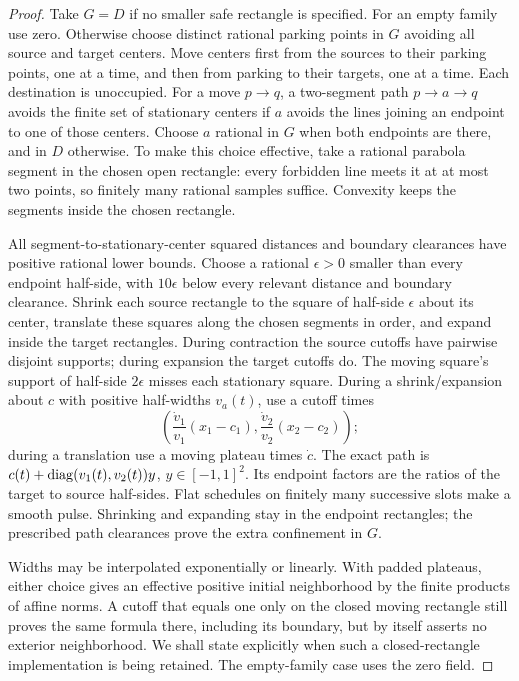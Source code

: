 \begin{proof}
Take $G=D$ if no smaller safe rectangle is specified.
For an empty family use zero.  Otherwise choose distinct rational
parking points in $G$ avoiding all source and
target centers.  Move centers first from the sources to their parking
points, one at a time, and then from parking to their targets, one at a
time.  Each destination is unoccupied.  For a move $p\to q$, a two-segment
path $p\to a\to q$ avoids the finite set of stationary centers if $a$
avoids the lines joining an endpoint to one of those centers.  Choose
$a$ rational in $G$ when both endpoints are there, and in $D$ otherwise.
To make this choice effective, take a rational parabola segment in the
chosen open rectangle: every forbidden line meets it at at most two
points, so finitely many rational samples suffice.  Convexity keeps the
segments inside the chosen rectangle.

All segment-to-stationary-center squared distances and boundary
clearances have positive rational lower bounds.  Choose a rational
$\epsilon>0$ smaller than every endpoint half-side, with $10\epsilon$
below every relevant distance and boundary clearance.  Shrink each
source rectangle to the square of half-side $\epsilon$ about its center,
translate these squares along the chosen segments in order, and expand
inside the target rectangles.  During contraction the source cutoffs have pairwise disjoint supports;
during expansion the target cutoffs do.  The moving square's support
of half-side $2\epsilon$ misses each stationary square.  During a shrink/expansion about $c$ with
positive half-widths $v_a(t)$, use a cutoff times
\[
 \left(\frac{\dot v_1}{v_1}(x_1-c_1),
       \frac{\dot v_2}{v_2}(x_2-c_2)\right);
\]
during a translation use a moving plateau times $\dot c$.
The exact path is $c(t)+\operatorname{diag}(v_1(t),v_2(t))y$, $y\in[-1,1]^2$.
Its endpoint factors are the ratios of the target to source half-sides.
Flat schedules on finitely many successive slots make a smooth pulse.
Shrinking and expanding stay in the endpoint rectangles; the prescribed
path clearances prove the extra confinement in $G$.

Widths may be interpolated exponentially or linearly.  With padded
plateaus, either choice gives an effective positive initial neighborhood
by the finite products of affine norms.  A cutoff that equals one only
on the closed moving rectangle still proves the same formula there,
including its boundary, but by itself asserts no exterior neighborhood.
We shall state explicitly when such a closed-rectangle implementation
is being retained.  The empty-family case uses the zero field.
\end{proof}

